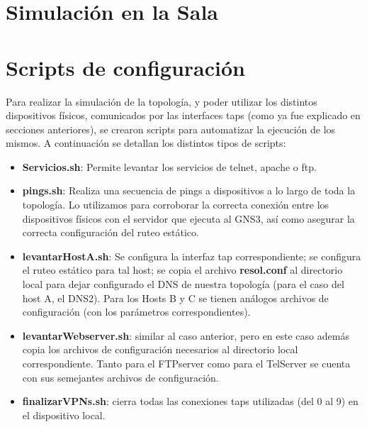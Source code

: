 \documentclass[12pt,a4paper,spanish]{article}
\begin{document}




\section{Simulación en la Sala}


\section{Scripts de configuración}
Para realizar la simulación de la topología, y poder utilizar los distintos dispositivos físicos, comunicados por las interfaces taps (como ya fue explicado en secciones anteriores), se crearon scripts para automatizar la ejecución de los mismos. A continuación se detallan los distintos tipos de scripts:
\begin{itemize}
	\item \textbf{Servicios.sh}: Permite levantar los servicios de telnet, apache o ftp.
	\item \textbf{pings.sh}: Realiza una secuencia de pings a dispositivos a lo largo de toda la topología. Lo utilizamos para corroborar la
		 correcta conexión entre los dispositivos físicos con el servidor que ejecuta al GNS3, así como asegurar la correcta configuración
		 del ruteo estático.
	\item \textbf{levantarHostA.sh}: Se configura la interfaz tap correspondiente; se configura el ruteo estático para tal host; se copia el 
		archivo \textbf{resol.conf} al directorio local para dejar configurado el DNS de nuestra topología (para el caso del host A, el DNS2).
		Para los Hosts B y C se tienen análogos archivos de configuración (con los parámetros correspondientes).
	\item \textbf{levantarWebserver.sh}: similar al caso anterior, pero en este caso además copia los archivos de configuración necesarios al
		directorio local correspondiente. Tanto para el FTPserver como para el TelServer se cuenta con sus semejantes archivos de 
		configuración.
	\item \textbf{finalizarVPNs.sh}: cierra todas las conexiones taps utilizadas (del 0 al 9) en el dispositivo local.
\end{itemize}

\newpage

\end{document}
